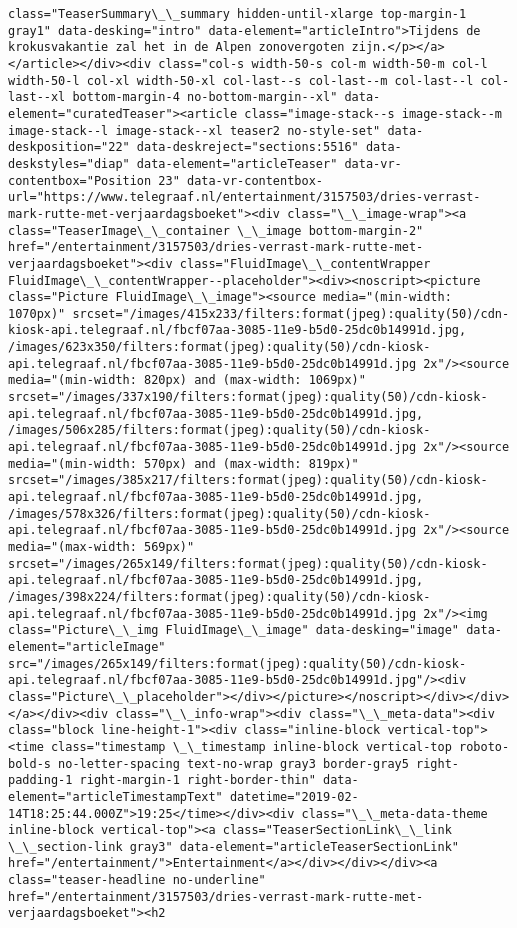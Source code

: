 \documentclass[11pt]{article}
\begin{document}
\begin{Verbatim}[commandchars=\\\{\}]
class="TeaserSummary\_\_summary hidden-until-xlarge top-margin-1 gray1" data-desking="intro" data-element="articleIntro">Tijdens de krokusvakantie zal het in de Alpen zonovergoten zijn.</p></a></article></div><div class="col-s width-50-s col-m width-50-m col-l width-50-l col-xl width-50-xl col-last--s col-last--m col-last--l col-last--xl bottom-margin-4 no-bottom-margin--xl" data-element="curatedTeaser"><article class="image-stack--s image-stack--m image-stack--l image-stack--xl teaser2 no-style-set" data-deskposition="22" data-deskreject="sections:5516" data-deskstyles="diap" data-element="articleTeaser" data-vr-contentbox="Position 23" data-vr-contentbox-url="https://www.telegraaf.nl/entertainment/3157503/dries-verrast-mark-rutte-met-verjaardagsboeket"><div class="\_\_image-wrap"><a class="TeaserImage\_\_container \_\_image bottom-margin-2" href="/entertainment/3157503/dries-verrast-mark-rutte-met-verjaardagsboeket"><div class="FluidImage\_\_contentWrapper FluidImage\_\_contentWrapper--placeholder"><div><noscript><picture class="Picture FluidImage\_\_image"><source media="(min-width: 1070px)" srcset="/images/415x233/filters:format(jpeg):quality(50)/cdn-kiosk-api.telegraaf.nl/fbcf07aa-3085-11e9-b5d0-25dc0b14991d.jpg, /images/623x350/filters:format(jpeg):quality(50)/cdn-kiosk-api.telegraaf.nl/fbcf07aa-3085-11e9-b5d0-25dc0b14991d.jpg 2x"/><source media="(min-width: 820px) and (max-width: 1069px)" srcset="/images/337x190/filters:format(jpeg):quality(50)/cdn-kiosk-api.telegraaf.nl/fbcf07aa-3085-11e9-b5d0-25dc0b14991d.jpg, /images/506x285/filters:format(jpeg):quality(50)/cdn-kiosk-api.telegraaf.nl/fbcf07aa-3085-11e9-b5d0-25dc0b14991d.jpg 2x"/><source media="(min-width: 570px) and (max-width: 819px)" srcset="/images/385x217/filters:format(jpeg):quality(50)/cdn-kiosk-api.telegraaf.nl/fbcf07aa-3085-11e9-b5d0-25dc0b14991d.jpg, /images/578x326/filters:format(jpeg):quality(50)/cdn-kiosk-api.telegraaf.nl/fbcf07aa-3085-11e9-b5d0-25dc0b14991d.jpg 2x"/><source media="(max-width: 569px)" srcset="/images/265x149/filters:format(jpeg):quality(50)/cdn-kiosk-api.telegraaf.nl/fbcf07aa-3085-11e9-b5d0-25dc0b14991d.jpg, /images/398x224/filters:format(jpeg):quality(50)/cdn-kiosk-api.telegraaf.nl/fbcf07aa-3085-11e9-b5d0-25dc0b14991d.jpg 2x"/><img class="Picture\_\_img FluidImage\_\_image" data-desking="image" data-element="articleImage" src="/images/265x149/filters:format(jpeg):quality(50)/cdn-kiosk-api.telegraaf.nl/fbcf07aa-3085-11e9-b5d0-25dc0b14991d.jpg"/><div class="Picture\_\_placeholder"></div></picture></noscript></div></div></a></div><div class="\_\_info-wrap"><div class="\_\_meta-data"><div class="block line-height-1"><div class="inline-block vertical-top"><time class="timestamp \_\_timestamp inline-block vertical-top roboto-bold-s no-letter-spacing text-no-wrap gray3 border-gray5 right-padding-1 right-margin-1 right-border-thin" data-element="articleTimestampText" datetime="2019-02-14T18:25:44.000Z">19:25</time></div><div class="\_\_meta-data-theme inline-block vertical-top"><a class="TeaserSectionLink\_\_link \_\_section-link gray3" data-element="articleTeaserSectionLink" href="/entertainment/">Entertainment</a></div></div></div><a class="teaser-headline no-underline" href="/entertainment/3157503/dries-verrast-mark-rutte-met-verjaardagsboeket"><h2 
\end{Verbatim}
\end{document}
